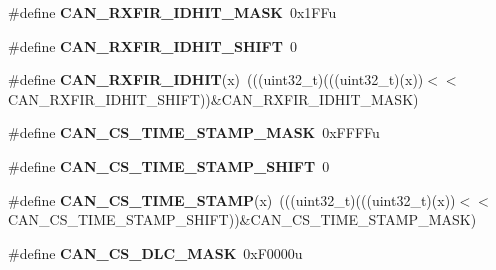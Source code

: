 \begin{DoxyCompactItemize}
\item 
\#define {\bfseries C\+A\+N\+\_\+\+R\+X\+F\+I\+R\+\_\+\+I\+D\+H\+I\+T\+\_\+\+M\+A\+SK}~0x1\+F\+Fu\hypertarget{group__CAN__Register__Masks_ga097ddfd77b23ddd23341d8ea269ce64b}{}\label{group__CAN__Register__Masks_ga097ddfd77b23ddd23341d8ea269ce64b}

\item 
\#define {\bfseries C\+A\+N\+\_\+\+R\+X\+F\+I\+R\+\_\+\+I\+D\+H\+I\+T\+\_\+\+S\+H\+I\+FT}~0\hypertarget{group__CAN__Register__Masks_ga6a1b5e43de75851c0bdc5690c1715a14}{}\label{group__CAN__Register__Masks_ga6a1b5e43de75851c0bdc5690c1715a14}

\item 
\#define {\bfseries C\+A\+N\+\_\+\+R\+X\+F\+I\+R\+\_\+\+I\+D\+H\+IT}(x)~(((uint32\+\_\+t)(((uint32\+\_\+t)(x))$<$$<$C\+A\+N\+\_\+\+R\+X\+F\+I\+R\+\_\+\+I\+D\+H\+I\+T\+\_\+\+S\+H\+I\+FT))\&C\+A\+N\+\_\+\+R\+X\+F\+I\+R\+\_\+\+I\+D\+H\+I\+T\+\_\+\+M\+A\+SK)\hypertarget{group__CAN__Register__Masks_ga8b2cdf4be2403ad67220d43309a7ab91}{}\label{group__CAN__Register__Masks_ga8b2cdf4be2403ad67220d43309a7ab91}

\item 
\#define {\bfseries C\+A\+N\+\_\+\+C\+S\+\_\+\+T\+I\+M\+E\+\_\+\+S\+T\+A\+M\+P\+\_\+\+M\+A\+SK}~0x\+F\+F\+F\+Fu\hypertarget{group__CAN__Register__Masks_ga70e77ee06fb6bf69b46020d1e3b91819}{}\label{group__CAN__Register__Masks_ga70e77ee06fb6bf69b46020d1e3b91819}

\item 
\#define {\bfseries C\+A\+N\+\_\+\+C\+S\+\_\+\+T\+I\+M\+E\+\_\+\+S\+T\+A\+M\+P\+\_\+\+S\+H\+I\+FT}~0\hypertarget{group__CAN__Register__Masks_gaa9e77f6476678316f4bedf1b02afe0d0}{}\label{group__CAN__Register__Masks_gaa9e77f6476678316f4bedf1b02afe0d0}

\item 
\#define {\bfseries C\+A\+N\+\_\+\+C\+S\+\_\+\+T\+I\+M\+E\+\_\+\+S\+T\+A\+MP}(x)~(((uint32\+\_\+t)(((uint32\+\_\+t)(x))$<$$<$C\+A\+N\+\_\+\+C\+S\+\_\+\+T\+I\+M\+E\+\_\+\+S\+T\+A\+M\+P\+\_\+\+S\+H\+I\+FT))\&C\+A\+N\+\_\+\+C\+S\+\_\+\+T\+I\+M\+E\+\_\+\+S\+T\+A\+M\+P\+\_\+\+M\+A\+SK)\hypertarget{group__CAN__Register__Masks_gadd5ca585a16641a7a0046706f91185ce}{}\label{group__CAN__Register__Masks_gadd5ca585a16641a7a0046706f91185ce}

\item 
\#define {\bfseries C\+A\+N\+\_\+\+C\+S\+\_\+\+D\+L\+C\+\_\+\+M\+A\+SK}~0x\+F0000u\hypertarget{group__CAN__Register__Masks_ga968a36f7478c9fad396ac64b5f1f18a2}{}\label{group__CAN__Register__Masks_ga968a36f7478c9fad396ac64b5f1f18a2}


\end{DoxyCompactItemize}
